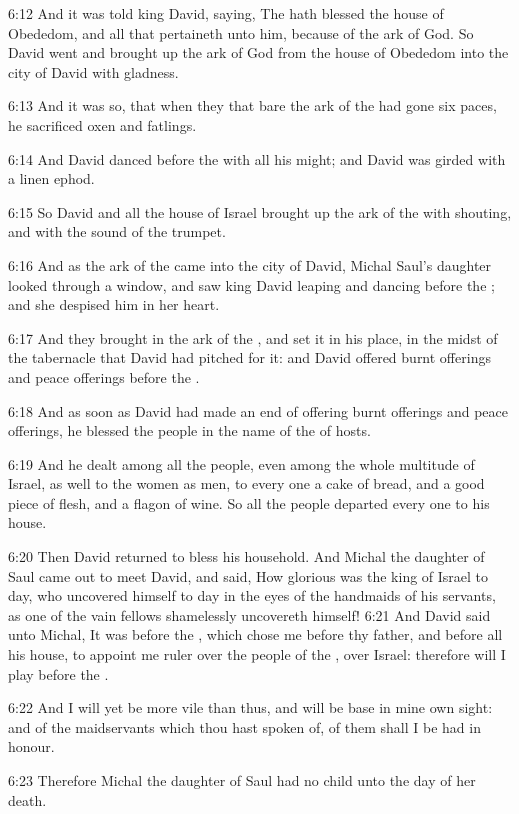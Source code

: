 6:12 And it was told king David, saying, The \LORD hath blessed the house of Obededom, and all that pertaineth unto him, because of the ark of God. So David went and brought up the ark of God from the house of Obededom into the city of David with gladness.

6:13 And it was so, that when they that bare the ark of the \LORD had gone six paces, he sacrificed oxen and fatlings.

6:14 And David danced before the \LORD with all his might; and David was girded with a linen ephod.

6:15 So David and all the house of Israel brought up the ark of the \LORD with shouting, and with the sound of the trumpet.

6:16 And as the ark of the \LORD came into the city of David, Michal Saul's daughter looked through a window, and saw king David leaping and dancing before the \LORD; and she despised him in her heart.

6:17 And they brought in the ark of the \LORD, and set it in his place, in the midst of the tabernacle that David had pitched for it: and David offered burnt offerings and peace offerings before the \LORD.

6:18 And as soon as David had made an end of offering burnt offerings and peace offerings, he blessed the people in the name of the \LORD of hosts.

6:19 And he dealt among all the people, even among the whole multitude of Israel, as well to the women as men, to every one a cake of bread, and a good piece of flesh, and a flagon of wine. So all the people departed every one to his house.

6:20 Then David returned to bless his household. And Michal the daughter of Saul came out to meet David, and said, How glorious was the king of Israel to day, who uncovered himself to day in the eyes of the handmaids of his servants, as one of the vain fellows shamelessly uncovereth himself!  6:21 And David said unto Michal, It was before the \LORD, which chose me before thy father, and before all his house, to appoint me ruler over the people of the \LORD, over Israel: therefore will I play before the \LORD.

6:22 And I will yet be more vile than thus, and will be base in mine own sight: and of the maidservants which thou hast spoken of, of them shall I be had in honour.

6:23 Therefore Michal the daughter of Saul had no child unto the day of her death.

